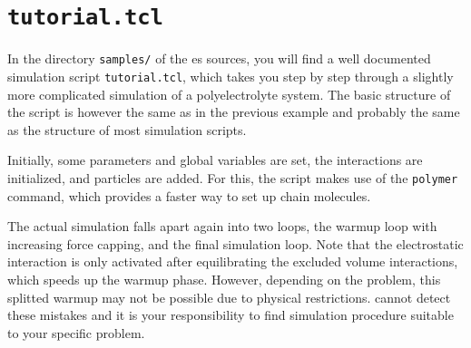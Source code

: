 \section{\texttt{tutorial.tcl}}

In the directory \texttt{samples/} of the es{} sources, you will find
a well documented simulation script \texttt{tutorial.tcl}, which takes
you step by step through a slightly more complicated simulation of a
polyelectrolyte system. The basic structure of the script is however
the same as in the previous example and probably the same as the
structure of most \es{} simulation scripts.

Initially, some parameters and global variables are set, the
interactions are initialized, and particles are added. For this, the
script makes use of the \verb|polymer| command, which provides a
faster way to set up chain molecules.

The actual simulation falls apart again into two loops, the warmup
loop with increasing force capping, and the final simulation loop.
Note that the electrostatic interaction is only activated after
equilibrating the excluded volume interactions, which speeds up the
warmup phase. However, depending on the problem, this splitted warmup
may not be possible due to physical restrictions. \es{} cannot detect
these mistakes and it is your responsibility to find simulation
procedure suitable to your specific problem.

